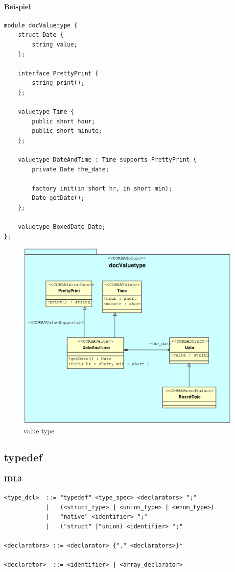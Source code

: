 \documentclass [a4paper,10pt] {scrartcl}
\begin{document}
\paragraph{Beispiel}
\begin{verbatim}
module docValuetype {
    struct Date {
        string value;
    };

    interface PrettyPrint {
        string print();
    };

    valuetype Time {
        public short hour;
        public short minute;
    };

    valuetype DateAndTime : Time supports PrettyPrint {
        private Date the_date;

        factory init(in short hr, in short min);
        Date getDate();
    };

    valuetype BoxedDate Date;
};
\end{verbatim}
\begin{figure}[!h]
\centerline{\includegraphics[width=\linewidth]{docValuetype.eps}}
\caption{value type}
\label{fig:valuetype}
\end{figure}

\cleardoublepage
\subsection{typedef}
\paragraph{IDL3}
\begin{verbatim}
<type_dcl>  ::= "typedef" <type_spec> <declarators> ";"
            |   (<struct_type> | <union_type> | <enum_type>)
            |   "native" <identifier> ";"
            |   ("struct" |"union) <identifier> ";"

<declarators> ::= <declarator> {"," <declarators>}*

<declarator>  ::= <identifier> | <array_declarator>
\end{verbatim}
\end{document}

